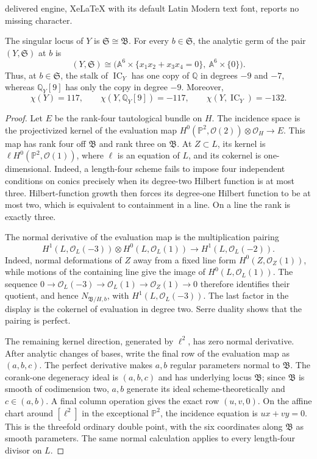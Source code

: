 \documentclass[10pt,a4paper]{amsart}
\newcommand{\IC}{\operatorname{IC}}
\newcommand{\Ocal}{\mathcal O}
\newcommand{\Pp}{\mathbb P}
\newcommand{\Q}{\mathbb Q}
\begin{document}
delivered engine, XeLaTeX with its default Latin Modern text font, reports no missing character.
\begin{proposition}\label{prop:conic-correction-node}
The singular locus of $Y$ is $\mathfrak S\cong\mathfrak B$.  For every
$b\in\mathfrak S$, the analytic germ of the pair $(Y,\mathfrak S)$ at $b$
is
\[
 (Y,\mathfrak S)\cong
 \bigl(\mathbb A^6\times
       \{x_1x_2+x_3x_4=0\},\ \mathbb A^6\times\{0\}\bigr).
\]
Thus, at $b\in\mathfrak S$, the stalk of $\IC_Y$ has one copy of $\Q$ in
degrees $-9$ and $-7$, whereas $\Q_Y[9]$ has only the copy in degree
$-9$.  Moreover,
\[
 \chi(Y)=117,\qquad
 \chi(Y,\Q_Y[9])=-117,\qquad
 \chi(Y,\IC_Y)=-132.
\]
\end{proposition}

\begin{proof}
Let $E$ be the rank-four tautological bundle on $H$.  The incidence space is
the projectivized kernel of the evaluation map
$H^0(\Pp^2,\Ocal(2))\otimes\Ocal_H\to E$.  This map has rank four off
$\mathfrak B$ and rank three on $\mathfrak B$.  At $Z\subset L$, its kernel
is $\ell H^0(\Pp^2,\Ocal(1))$, where $\ell$ is an equation of $L$, and its
cokernel is one-dimensional.  Indeed, a length-four scheme fails to impose
four independent conditions on conics precisely when its degree-two
Hilbert function is at most three.  Hilbert-function growth then forces its
degree-one Hilbert function to be at most two, which is equivalent to
containment in a line.  On a line the rank is exactly three.

The normal derivative of the evaluation map is the multiplication pairing
\[
 H^1(L,\Ocal_L(-3))\otimes H^0(L,\Ocal_L(1))
       \longrightarrow H^1(L,\Ocal_L(-2)).
\]
Indeed, normal deformations of $Z$ away from a fixed line form
$H^0(Z,\Ocal_Z(1))$, while motions of the containing line give the image of
$H^0(L,\Ocal_L(1))$.  The sequence
$0\to\Ocal_L(-3)\to\Ocal_L(1)\to\Ocal_Z(1)\to0$ therefore identifies their
quotient, and hence $N_{\mathfrak B/H,b}$, with
$H^1(L,\Ocal_L(-3))$.  The last factor in the display is the cokernel of
evaluation in degree two.  Serre duality
shows that the pairing is perfect.

The remaining kernel direction,
generated by $\ell^2$, has zero normal derivative.  After analytic changes
of bases, write the final row of the evaluation map as $(a,b,c)$.  The
perfect derivative makes $a,b$ regular parameters normal to
$\mathfrak B$.  The corank-one degeneracy ideal is $(a,b,c)$ and has
underlying locus $\mathfrak B$; since $\mathfrak B$ is smooth of
codimension two, $a,b$ generate its ideal scheme-theoretically and
$c\in(a,b)$.  A final column operation gives the exact row $(u,v,0)$.  On
the affine chart around
$[\ell^2]$ in the exceptional $\Pp^2$, the incidence equation is
$ux+vy=0$.  This is the threefold ordinary double point, with the six
coordinates along $\mathfrak B$ as smooth parameters.  The same normal
calculation applies to every length-four divisor on $L$.


\end{proof}
\end{document}
